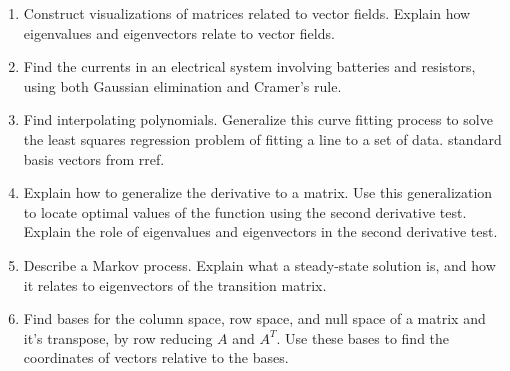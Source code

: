 \begin{enumerate}

\item Construct visualizations of matrices related to vector fields. Explain how eigenvalues and eigenvectors relate to vector fields.
\item Find the currents in an electrical system involving batteries and resistors, using both Gaussian elimination and Cramer's rule.
\item Find interpolating polynomials. Generalize this curve fitting process to solve the least squares regression problem of fitting a line to a set of data.
standard basis vectors from rref. 
\item Explain how to generalize the derivative to a matrix. Use this generalization to locate optimal values of the function using the second derivative test. Explain the role of eigenvalues and eigenvectors in the second derivative test.
\item Describe a Markov process. Explain what a steady-state solution is, and how it relates to eigenvectors of the transition matrix.
\item Find bases for the column space, row space, and null space of a matrix and it's transpose, by row reducing $A$ and $A^T$. Use these bases to find the coordinates of vectors relative to the bases.

\end{enumerate}
